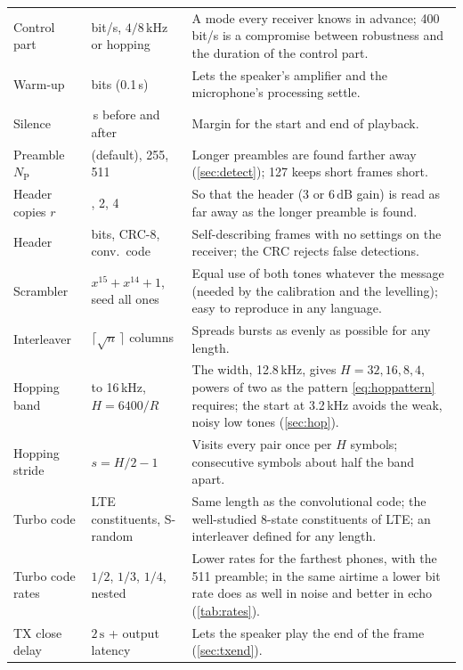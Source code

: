 \documentclass[11pt,a4paper]{article}
\newcommand{\kHz}{\,\mathrm{kHz}}
\newcommand{\dB}{\,\mathrm{dB}}
\newcommand{\NP}{N_{\mathrm{P}}}
\theoremstyle{remark}
\begin{document}
\begin{table}[p]
\begin{tabularx}{\linewidth}{>{\raggedright\arraybackslash}p{3.4cm}>{\raggedright\arraybackslash}p{3.1cm}X}
Control part & 400 bit/s, $4/8\kHz$ or hopping & A mode every receiver knows in advance; 400 bit/s is a compromise between robustness and the duration of the control part.\\
Warm-up & 40 bits (0.1\,s) & Lets the speaker's amplifier and the microphone's processing settle.\\
Silence & 0.2\,s before and after & Margin for the start and end of playback.\\
Preamble $\NP$ & 127 (default), 255, 511 & Longer preambles are found farther away (\cref{sec:detect}); 127 keeps short frames short.\\
Header copies $r$ & 1, 2, 4 & So that the header (3 or $6\dB$ gain) is read as far away as the longer preamble is found.\\
Header & 32 bits, CRC-8, conv.\ code & Self-describing frames with no settings on the receiver; the CRC rejects false detections.\\
Scrambler & $x^{15}+x^{14}+1$, seed all ones & Equal use of both tones whatever the message (needed by the calibration and the levelling); easy to reproduce in any language.\\
Interleaver & $\lceil\sqrt n\,\rceil$ columns & Spreads bursts as evenly as possible for any length.\\
Hopping band & 3.2 to 16\,kHz, $H = 6400/R$ & The width, 12.8\,kHz, gives $H = 32, 16, 8, 4$, powers of two as the pattern \cref{eq:hoppattern} requires; the start at 3.2\,kHz avoids the weak, noisy low tones (\cref{sec:hop}).\\
Hopping stride & $s = H/2 - 1$ & Visits every pair once per $H$ symbols; consecutive symbols about half the band apart.\\
Turbo code & LTE constituents, S-random & Same length as the convolutional code; the well-studied 8-state constituents of LTE; an interleaver defined for any length.\\
Turbo code rates & $1/2$, $1/3$, $1/4$, nested & Lower rates for the farthest phones, with the 511 preamble; in the same airtime a lower bit rate does as well in noise and better in echo (\cref{tab:rates}).\\
TX close delay & $2\,\text{s}$ + output latency & Lets the speaker play the end of the frame (\cref{sec:txend}).\\
\bottomrule
\end{tabularx}
\end{table}
\end{document}

